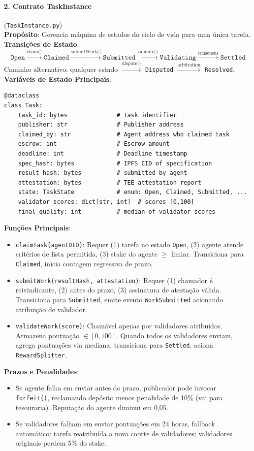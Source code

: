 \documentclass[11pt]{article}
\begin{document}
\paragraph{2. Contrato TaskInstance} (\texttt{TaskInstance.py})\\
\textbf{Propósito}: Gerencia máquina de estados do ciclo de vida para uma única tarefa.\\
\textbf{Transições de Estado}:
\begin{equation}
\texttt{Open} \xrightarrow{\text{claim()}} \texttt{Claimed} \xrightarrow{\text{submitWork()}} \texttt{Submitted} \xrightarrow{\text{validate()}} \texttt{Validating} \xrightarrow{\text{consensus}} \texttt{Settled}
\end{equation}
Caminho alternativo: qualquer estado $\xrightarrow{\text{dispute()}}$ \texttt{Disputed} $\xrightarrow{\text{arbitration}}$ \texttt{Resolved}.\\
\textbf{Variáveis de Estado Principais}:
\begin{verbatim}
@dataclass
class Task:
    task_id: bytes              # Task identifier
    publisher: str              # Publisher address
    claimed_by: str             # Agent address who claimed task
    escrow: int                 # Escrow amount
    deadline: int               # Deadline timestamp
    spec_hash: bytes            # IPFS CID of specification
    result_hash: bytes          # submitted by agent
    attestation: bytes          # TEE attestation report
    state: TaskState            # enum: Open, Claimed, Submitted, ...
    validator_scores: dict[str, int]  # scores [0,100]
    final_quality: int          # median of validator scores
\end{verbatim}
\textbf{Funções Principais}:
\begin{itemize}[noitemsep]
  \item \texttt{claimTask(agentDID)}: Requer (1) tarefa no estado \texttt{Open}, (2) agente atende critérios de lista permitida, (3) stake do agente $\geq$ limiar. Transiciona para \texttt{Claimed}, inicia contagem regressiva de prazo.
  \item \texttt{submitWork(resultHash, attestation)}: Requer (1) chamador é reivindicante, (2) antes do prazo, (3) assinatura de atestação válida. Transiciona para \texttt{Submitted}, emite evento \texttt{WorkSubmitted} acionando atribuição de validador.
  \item \texttt{validateWork(score)}: Chamável apenas por validadores atribuídos. Armazena pontuação $\in [0,100]$. Quando todos os validadores enviam, agrega pontuações via mediana, transiciona para \texttt{Settled}, aciona \texttt{RewardSplitter}.
\end{itemize}
\textbf{Prazos e Penalidades}:
\begin{itemize}[noitemsep]
  \item Se agente falha em enviar antes do prazo, publicador pode invocar \texttt{forfeit()}, reclamando depósito menos penalidade de 10\% (vai para tesouraria). Reputação do agente diminui em 0,05.
  \item Se validadores falham em enviar pontuações em 24 horas, fallback automático: tarefa reatribuída a nova coorte de validadores; validadores originais perdem 5\% do stake.
\end{itemize}
\end{document}
